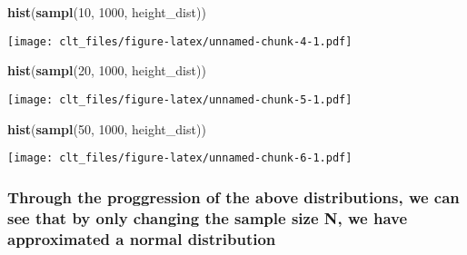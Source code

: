 \documentclass[
]{article}
\newenvironment{Shaded}{\begin{snugshade}}{\end{snugshade}}
\newcommand{\DecValTok}[1]{\textcolor[rgb]{0.00,0.00,0.81}{#1}}
\newcommand{\KeywordTok}[1]{\textcolor[rgb]{0.13,0.29,0.53}{\textbf{#1}}}
\newcommand{\NormalTok}[1]{#1}
\begin{document}
\begin{Shaded}
\begin{Highlighting}[]
\KeywordTok{hist}\NormalTok{(}\KeywordTok{sampl}\NormalTok{(}\DecValTok{10}\NormalTok{, }\DecValTok{1000}\NormalTok{, height_dist))}
\end{Highlighting}
\end{Shaded}

\texttt{[image: clt\_files/figure-latex/unnamed-chunk-4-1.pdf]}

\begin{Shaded}
\begin{Highlighting}[]
\KeywordTok{hist}\NormalTok{(}\KeywordTok{sampl}\NormalTok{(}\DecValTok{20}\NormalTok{, }\DecValTok{1000}\NormalTok{, height_dist))}
\end{Highlighting}
\end{Shaded}

\texttt{[image: clt\_files/figure-latex/unnamed-chunk-5-1.pdf]}

\begin{Shaded}
\begin{Highlighting}[]
\KeywordTok{hist}\NormalTok{(}\KeywordTok{sampl}\NormalTok{(}\DecValTok{50}\NormalTok{, }\DecValTok{1000}\NormalTok{, height_dist))}
\end{Highlighting}
\end{Shaded}

\texttt{[image: clt\_files/figure-latex/unnamed-chunk-6-1.pdf]}

\hypertarget{through-the-proggression-of-the-above-distributions-we-can-see-that-by-only-changing-the-sample-size-n-we-have-approximated-a-normal-distribution}{%
\subsubsection{Through the proggression of the above distributions, we
can see that by only changing the sample size N, we have approximated a
normal
distribution}\label{through-the-proggression-of-the-above-distributions-we-can-see-that-by-only-changing-the-sample-size-n-we-have-approximated-a-normal-distribution}}
\end{document}
